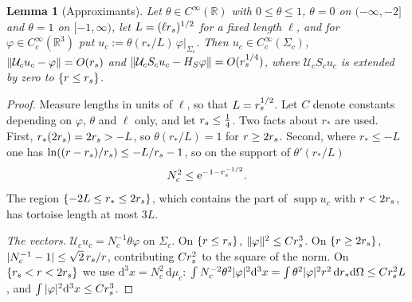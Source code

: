 \documentclass[10pt,a4paper]{amsart}
\newtheorem{alemma}{Lemma}
\theoremstyle{definition}
\theoremstyle{remark}
\newcommand{\R}{\mathbb{R}}
\newcommand{\rmd}{\mathrm{d}}
\newcommand{\rme}{\mathrm{e}}
\DeclareMathOperator{\supp}{supp}
\begin{document}
\begin{alemma}[Approximants]\label{lem:approximants}
Let $\theta\in C^\infty(\R)$ with $0\leq\theta\leq1$, $\theta=0$ on
$(-\infty,-2]$ and $\theta=1$ on $[-1,\infty)$, let $L=(\ell r_{\rm s})^{1/2}$ for a fixed
length $\ell$, and for $\varphi\in C_c^\infty(\R^3)$ put $u_c:=\theta(r_*/L)\,
\varphi|_{\Sigma_c}$. Then $u_c\in C_c^\infty(\Sigma_c)$,
$\|\mathcal{U}_cu_c-\varphi\|=O(r_{\rm s})$ and $\|\mathcal{U}_cS_cu_c-
H_S\varphi\|=O(r_{\rm s}^{1/4})$, where $\mathcal{U}_cS_cu_c$ is extended
by zero to $\{r\leq r_{\rm s}\}$.
\end{alemma}

\begin{proof}
Measure lengths in units of $\ell$, so that $L=r_{\rm s}^{1/2}$. Let $C$
denote constants depending on $\varphi$, $\theta$ and $\ell$ only, and
let $r_{\rm s}\leq\frac14$. Two facts about $r_*$ are used. First,
$r_*(2r_{\rm s})=2r_{\rm s}>-L$, so $\theta(r_*/L)=1$ for $r\geq
2r_{\rm s}$. Second, where $r_*\leq-L$ one has $\ln((r-r_{\rm s})/r_{\rm s})
\leq-L/r_{\rm s}-1$, so on the support of $\theta'(r_*/L)$
\begin{equation}\label{eq:tiny-lapse}
N_c^2\leq\rme^{-1-r_{\rm s}^{-1/2}} .
\end{equation}
The region $\{-2L\leq r_*\leq2r_{\rm s}\}$, which contains the part of
$\supp u_c$ with $r<2r_{\rm s}$, has tortoise length at most $3L$.

\emph{The vectors.} $\mathcal{U}_cu_c=N_c^{-1}\theta\varphi$ on
$\Sigma_c$. On $\{r\leq r_{\rm s}\}$, $\|\varphi\|^2\leq Cr_{\rm s}^3$. On
$\{r\geq2r_{\rm s}\}$, $|N_c^{-1}-1|\leq\sqrt2\,r_{\rm s}/r$, contributing
$Cr_{\rm s}^2$ to the square of the norm. On $\{r_{\rm s}<r<2r_{\rm s}\}$
we use $\rmd^3x=N_c^2\,\rmd\mu_c$: $\int N_c^{-2}\theta^2|\varphi|^2
\rmd^3x=\int\theta^2|\varphi|^2r^2\,\rmd r_*\rmd\Omega\leq Cr_{\rm s}^2L$,
and $\int|\varphi|^2\rmd^3x\leq Cr_{\rm s}^3$.


\end{proof}
\end{document}
